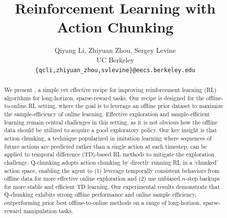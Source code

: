 \documentclass{article}
\title{Reinforcement Learning with Action Chunking}
\author{
  Qiyang Li, Zhiyuan Zhou, Sergey Levine \\ UC Berkeley \\ \texttt{\{qcli,zhiyuan\_zhou,svlevine\}@eecs.berkeley.edu}
}
\begin{document}
\hypersetup{colorlinks=true, allcolors=ourblue}

\maketitle
\begin{abstract}
We present , a simple yet effective recipe for improving reinforcement learning (RL) algorithms for long-horizon, sparse-reward tasks. Our recipe is designed for the offline-to-online RL setting, where the goal is to leverage an offline prior dataset to maximize the sample-efficiency of online learning. Effective exploration and sample-efficient learning remain central challenges in this setting, as it is not obvious how the offline data should be utilized to acquire a good exploratory policy.
Our key insight is that action chunking, a technique popularized in imitation learning where sequences of future actions are predicted rather than a single action at each timestep, can be applied to temporal difference (TD)-based RL methods to mitigate the exploration challenge.
Q-chunking adopts action chunking by directly running RL in a `chunked' action space, enabling the agent to (1) leverage temporally consistent behaviors from offline data for more effective online exploration and (2) use unbiased $n$-step backups for more stable and efficient TD learning. Our experimental results demonstrate that Q-chunking exhibits strong offline performance and online sample efficiency, outperforming prior best offline-to-online methods on a range of long-horizon, sparse-reward manipulation tasks.
\begin{figure}[H]


\end{figure}
\end{abstract}
\end{document}
